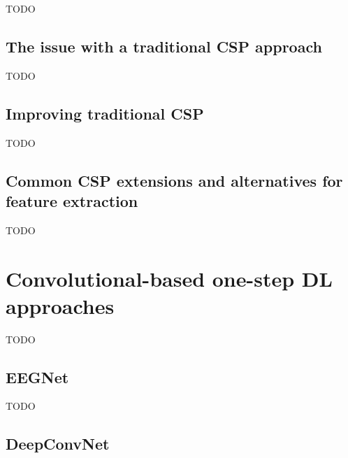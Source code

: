 TODO


\subsection{The issue with a traditional CSP approach}
\label{subsec:offline_bci_system_two_step_ml_basic_csp_issue}

TODO


\subsection{Improving traditional CSP}
\label{subsec:offline_bci_system_two_step_ml_basic_csp_improving}

TODO


\subsection{Common CSP extensions and alternatives for feature extraction}
\label{subsec:offline_bci_system_two_step_ml_csp_extensions}

TODO

\section{Convolutional-based one-step DL approaches}
\label{sec:offline_bci_system_one_step_dl}


TODO


\subsection{EEGNet}
\label{subsec:offline_bci_system_one_step_dl_eegnet}

TODO


\subsection{DeepConvNet}
\label{subsec:offline_bci_system_one_step_dl_deepconvnet}

